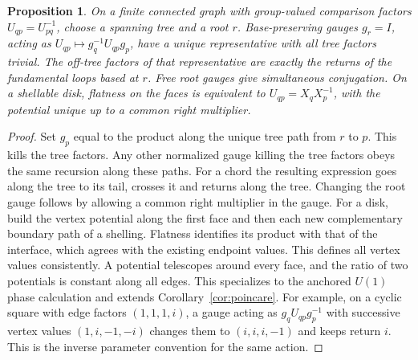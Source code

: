 \documentclass[11pt,reqno]{amsart}
\newtheorem{proposition}[theorem]{Proposition}
\theoremstyle{definition}
\theoremstyle{remark}
\numberwithin{equation}{section}
\begin{document}
\begin{proposition}\label{m3:gauge}
On a finite connected graph with group-valued comparison factors
\(U_{qp}=U_{pq}^{-1}\), choose a spanning tree and a root \(r\).
Base-preserving gauges \(g_r=I\), acting as
\(U_{qp}\mapsto g_q^{-1}U_{qp}g_p\), have a unique representative
with all tree factors trivial. The off-tree factors of that
representative are exactly the returns of the fundamental loops
based at \(r\). Free root gauges give simultaneous conjugation.
On a shellable disk, flatness on the faces is equivalent to
\(U_{qp}=X_q X_p^{-1}\), with the potential unique up to
a common right multiplier.
\end{proposition}
\begin{proof}
Set \(g_p\) equal to the product along the unique tree path from
\(r\) to \(p\). This kills the tree factors. Any other normalized
gauge killing the tree factors obeys the same recursion along
these paths. For a chord the resulting expression goes along
the tree to its tail, crosses it and returns along the tree.
Changing the root gauge follows by allowing a common right
multiplier in the gauge. For a disk, build the vertex potential
along the first face and then each new complementary boundary
path of a shelling. Flatness identifies its product with that
of the interface, which agrees with the existing endpoint
values. This defines all vertex values consistently. A potential
telescopes around every face, and the ratio of two potentials
is constant along all edges. This specializes to the anchored
\(U(1)\) phase calculation and extends
Corollary~\ref{cor:poincare}. For example, on a cyclic square with
edge factors \((1,1,1,i)\), a gauge acting as \(g_q U_{qp}g_p^{-1}\)
with successive vertex values \((1,i,-1,-i)\) changes them to
\((i,i,i,-1)\) and keeps return \(i\). This is the inverse
parameter convention for the same action.
\end{proof}
\end{document}
